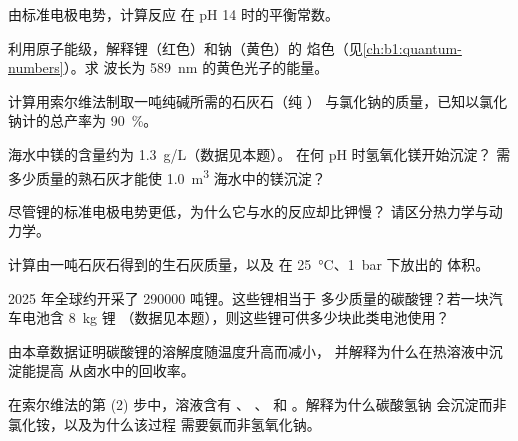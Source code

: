 \begin{exercise}[$\star$]\label{exo:b1:s-block:4}
由标准电极电势，计算反应 
在 pH 14 时的平衡常数。
\end{exercise}

\begin{exercise}[$\star\star$]\label{exo:b1:s-block:5}
利用原子能级，解释锂（红色）和钠（黄色）的
焰色（见\cref{ch:b1:quantum-numbers}）。求
波长为 \qty{589}{nm} 的黄色光子的能量。
\end{exercise}

\begin{exercise}[$\star\star$]\label{exo:b1:s-block:6}
计算用索尔维法制取一吨纯碱所需的石灰石（纯 ）
与氯化钠的质量，已知以氯化钠计的总产率为
\qty{90}{\percent}。
\end{exercise}

\begin{exercise}[$\star\star$]\label{exo:b1:s-block:7}
海水中镁的含量约为 \qty{1.3}{g/L}（数据见本题）。
在何 pH 时氢氧化镁开始沉淀？
需多少质量的熟石灰才能使 \qty{1.0}{m^3} 海水中的镁沉淀？
\end{exercise}

\begin{exercise}[$\star\star$]\label{exo:b1:s-block:8}
尽管锂的标准电极电势更低，为什么它与水的反应却比钾慢？
请区分热力学与动力学。
\end{exercise}

\begin{exercise}[$\star\star$]\label{exo:b1:s-block:9}
计算由一吨石灰石得到的生石灰质量，以及
在 \qty{25}{\celsius}、\qty{1}{bar} 下放出的  体积。
\end{exercise}

\begin{exercise}[$\star\star\star$]\label{exo:b1:s-block:10}
2025 年全球约开采了 \num{290000} 吨锂。这些锂相当于
多少质量的碳酸锂？若一块汽车电池含 \qty{8}{kg} 锂
（数据见本题），则这些锂可供多少块此类电池使用？
\end{exercise}

\begin{exercise}[$\star\star\star$]\label{exo:b1:s-block:11}
由本章数据证明碳酸锂的溶解度随温度升高而减小，
并解释为什么在热溶液中沉淀能提高
从卤水中的回收率。
\end{exercise}

\begin{exercise}[$\star\star\star$]\label{exo:b1:s-block:12}
在索尔维法的第 (2) 步中，溶液含有 、
、 和 。解释为什么碳酸氢钠
会沉淀而非氯化铵，以及为什么该过程
需要氨而非氢氧化钠。
\end{exercise}

